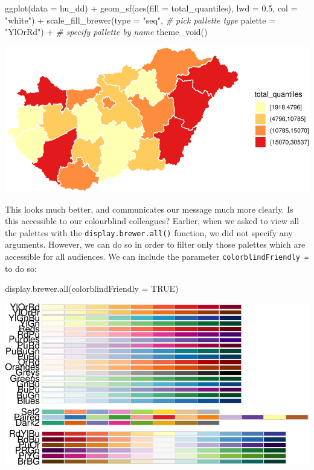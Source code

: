 \documentclass[
]{book}
\makeatletter
\newenvironment{Shaded}{\begin{snugshade}}{\end{snugshade}}
\newcommand{\AttributeTok}[1]{\textcolor[rgb]{0.61,0.61,0.61}{#1}}
\newcommand{\CommentTok}[1]{\textcolor[rgb]{0.37,0.37,0.37}{\textit{#1}}}
\newcommand{\ConstantTok}[1]{\textcolor[rgb]{0,0,0}{#1}}
\newcommand{\FloatTok}[1]{\textcolor[rgb]{0.06,0.06,0.06}{#1}}
\newcommand{\FunctionTok}[1]{\textcolor[rgb]{0,0,0}{#1}}
\newcommand{\NormalTok}[1]{#1}
\newcommand{\SpecialCharTok}[1]{\textcolor[rgb]{0,0,0}{#1}}
\newcommand{\StringTok}[1]{\textcolor[rgb]{0.5,0.5,0.5}{#1}}
\newenvironment{kframe}{%
\medskip{}
\setlength{\fboxsep}{.8em}
 \def\at@end@of@kframe{}%
 \ifinner\ifhmode%
  \def\at@end@of@kframe{\end{minipage}}%
  \begin{minipage}{\columnwidth}%
 \fi\fi%
 \def\FrameCommand##1{\hskip\@totalleftmargin \hskip-\fboxsep
 \colorbox{shadecolor}{##1}\hskip-\fboxsep
     \hskip-\linewidth \hskip-\@totalleftmargin \hskip\columnwidth}%
 \MakeFramed {\advance\hsize-\width
   \@totalleftmargin\z@ \linewidth\hsize
   \@setminipage}}%
 {\par\unskip\endMakeFramed%
 \at@end@of@kframe}
\renewenvironment{Shaded}{\begin{kframe}}{\end{kframe}}
\makeatother
\begin{document}
\begin{Shaded}
\begin{Highlighting}[]
\FunctionTok{ggplot}\NormalTok{(}\AttributeTok{data =}\NormalTok{ hu\_dd) }\SpecialCharTok{+} 
  \FunctionTok{geom\_sf}\NormalTok{(}\FunctionTok{aes}\NormalTok{(}\AttributeTok{fill =}\NormalTok{ total\_quantiles), }
          \AttributeTok{lwd =} \FloatTok{0.5}\NormalTok{, }
          \AttributeTok{col =} \StringTok{"white"}\NormalTok{) }\SpecialCharTok{+} 
  \FunctionTok{scale\_fill\_brewer}\NormalTok{(}\AttributeTok{type =} \StringTok{"seq"}\NormalTok{,   }\CommentTok{\# pick pallette type}
                    \AttributeTok{palette =} \StringTok{"YlOrRd"}\NormalTok{) }\SpecialCharTok{+}  \CommentTok{\# specify pallette by name}
  \FunctionTok{theme\_void}\NormalTok{()}
\end{Highlighting}
\end{Shaded}

\includegraphics{crime_mapping_files/figure-latex/colourbbrewerratefill-1.pdf}

This looks much better, and communicates our message much more clearly. Is this accessible to our colourblind colleagues? Earlier, when we asked to view all the palettes with the \texttt{display.brewer.all()} function, we did not specify any arguments. However, we can do so in order to filter only those palettes which are accessible for all audiences. We can include the parameter \texttt{colorblindFriendly\ =} to do so:

\begin{Shaded}
\begin{Highlighting}[]
\FunctionTok{display.brewer.all}\NormalTok{(}\AttributeTok{colorblindFriendly =} \ConstantTok{TRUE}\NormalTok{)}
\end{Highlighting}
\end{Shaded}

\includegraphics{crime_mapping_files/figure-latex/unnamed-chunk-158-1.pdf}
\end{document}

